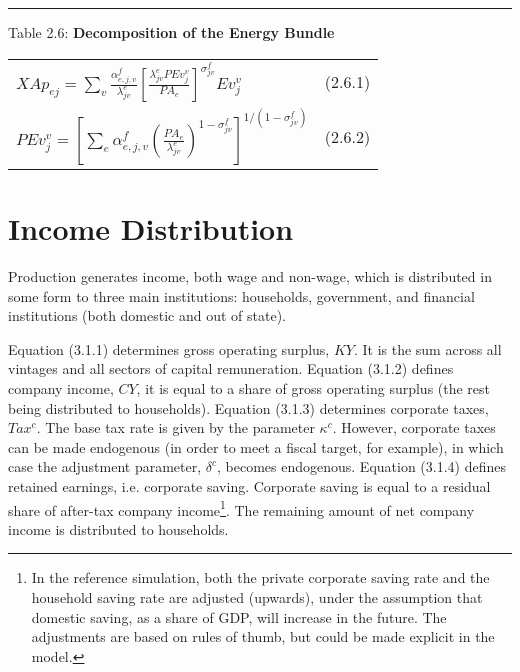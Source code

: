 \documentclass[12pt]{article}
\begin{document}
\newpage

\noindent\rule{\linewidth}{0.4pt}
\begin{center}
\begin{large}

{\centering Table 2.6: \textbf{Decomposition of the Energy Bundle} \par}

\begin{tabular}{>{\raggedright}p{} l}

$X\!Ap_{ej} = \displaystyle \sum_v \frac {\alpha^f_{e,j,v}} {\lambda^e_{jv}} \left[\frac {\lambda^e_{jv} PEv^v_j} {PA_e} \right]^{\sigma^f_{jv}} Ev^v_j$ & (2.6.1)\\[20pt]

$PEv^v_j = \left[\displaystyle \sum_e \alpha^f_{e,j,v} \left(\frac {P\!A_e} {\lambda^e_{jv}} \right)^{1-{\sigma^f_{jv}}} \right]^{1/(1-{\sigma^f_{jv}})}$ & (2.6.2)\\[15pt]

\hline
\end{tabular}
\end{large}
\end{center}

\section{Income Distribution}

Production generates income, both wage and non-wage, which is distributed in some form to three main institutions:  households, government, and financial institutions (both domestic and out of state).

Equation (3.1.1) determines gross operating surplus, $KY$. It is the sum across all vintages and all sectors of capital remuneration. Equation (3.1.2) defines company income, $CY$, it is equal to a share of gross operating surplus (the rest being distributed to households). Equation (3.1.3) determines corporate taxes, $Tax^c$. The base tax rate is given by the parameter $\kappa^c$. However, corporate taxes can be made endogenous (in order to meet a fiscal target, for example), in which case the adjustment parameter, $\delta^c$, becomes endogenous. Equation (3.1.4) defines retained earnings, i.e. corporate saving. Corporate saving is equal to a residual share of after-tax company income\footnote{In the reference simulation, both the private corporate saving rate and the household saving rate are adjusted (upwards), under the assumption that domestic saving, as a share of GDP, will increase in the future. The adjustments are based on rules of thumb, but could be made explicit in the model.}. The remaining amount of net company income is distributed to households.
\end{document}
